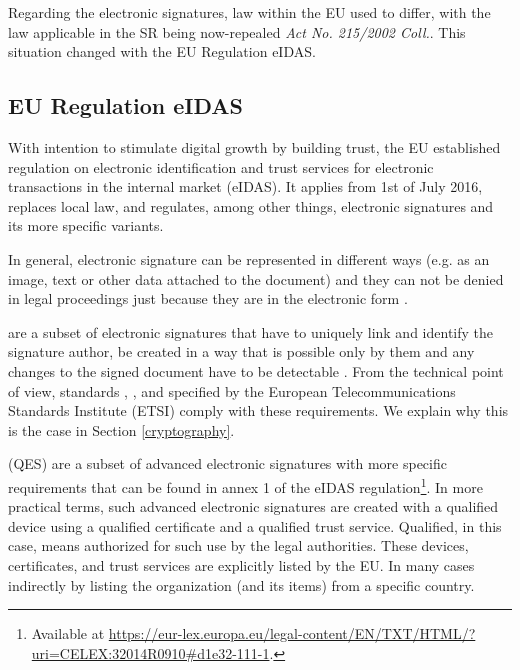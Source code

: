 \documentclass[thesismargins, english, thesislinespacing, onelinechapterstyle, upjsfrontpage]{rnthesis}
\begin{document}
Regarding the electronic signatures, law within the EU used to differ, with the law applicable in the SR being now-repealed \textit{Act No. 215/2002 Coll.}. This situation changed with the EU Regulation eIDAS.

\subsection{EU Regulation eIDAS} \label{eidas}

With intention to stimulate digital growth by building trust, the EU established regulation on electronic identification and trust services for electronic transactions in the internal market (eIDAS).
It applies from 1st of July 2016, replaces local law, and regulates, among other things, electronic signatures and its more specific variants.


In general, electronic signature can be represented in different ways (e.g. as an image, text or other data attached to the document) and they can not be denied in legal proceedings just because they are in the electronic form \cite{eidas}.

 are a subset of electronic signatures that have to uniquely link and identify the signature author, be created in a way that is possible only by them and any changes to the signed document have to be detectable \cite{eidas}.
From the technical point of view, standards , , and  specified by the European Telecommunications Standards Institute (ETSI) comply with these requirements. We explain why this is the case in Section \ref{cryptography}.

 (QES) are a subset of advanced electronic signatures with more specific requirements that can be found in annex 1 of the eIDAS regulation\footnote{Available at \url{https://eur-lex.europa.eu/legal-content/EN/TXT/HTML/?uri=CELEX:32014R0910\#d1e32-111-1}.}.
In more practical terms, such advanced electronic signatures are created with a qualified device using a qualified certificate and a qualified trust service.
Qualified, in this case, means authorized for such use by the legal authorities.
These devices, certificates, and trust services are explicitly listed by the EU. In many cases indirectly by listing the organization (and its items) from a specific country.
\end{document}
